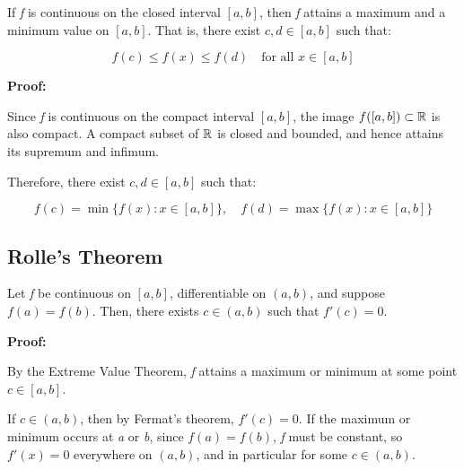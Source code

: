 If \emph{f} is continuous on the closed interval \([a, b] \), then \emph{f} attains a maximum and a 
minimum value on \([a, b]\). That is, there exist \( c, d \in [a, b] \) such that:

\[
    f(c) \le f(x) \le f(d) \quad \text{for all } x \in [a, b]
\]

\textbf{Proof:}  

Since \emph{f} is continuous on the compact interval \([a, b]\), the image \( f([a, b]) \subset \mathbb{R} \) 
is also compact. A compact subset of \( \mathbb{R} \) is closed and bounded, and hence 
attains its supremum and infimum.

Therefore, there exist \( c, d \in [a, b] \) such that:

\[
    f(c) = \min\{f(x): x \in [a, b]\}, \quad
    f(d) = \max\{f(x): x \in [a, b]\}
\]

\QED

\subsection{Rolle’s Theorem}
Let \emph{f} be continuous on \([a, b] \), differentiable on \((a, b) \), and suppose \( f(a) = f(b) \).  
Then, there exists \( c \in (a, b) \) such that \( f'(c) = 0 \).
\vspace{\baselineskip}

\textbf{Proof:}  

By the Extreme Value Theorem, \emph{f} attains a maximum or minimum at some point \( c \in [a, b] \).

If \( c \in (a, b) \), then by Fermat’s theorem, \( f'(c) = 0 \).  
If the maximum or minimum occurs at \emph{a} or \emph{b}, since \( f(a) = f(b) \), \emph{f} must be 
constant, so \( f'(x) = 0 \) everywhere on \((a, b)\), and in particular for some \( c \in (a, b) \).

\QED

\begin{center}
\end{center}



